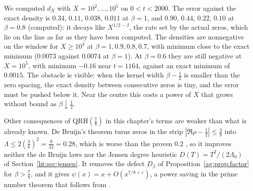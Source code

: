 We computed $d_X$ with $X=10^2,\dots,10^5$ on $0<t<2000$. The error against the exact density is $0.34$, $0.11$, $0.038$, $0.011$ at $\beta=1$, and $0.90$, $0.44$, $0.22$, $0.10$ at $\beta=0.8$ (computed): it decays like $X^{1/2-\beta}$, the rate set by the actual zeros, which lie on the line as far as they have been computed. The densities are nonnegative on the window for $X\ge10^3$ at $\beta=1,0.9,0.8,0.7$, with minimum close to the exact minimum ($0.0073$ against $0.0074$ at $\beta=1$). At $\beta=0.6$ they are still negative at $X=10^5$, with minimum $-0.16$ near $t=1164$, against an exact minimum of $0.0015$.
The obstacle is visible: when the kernel width $\beta-\frac12$ is smaller than the zero spacing, the exact density between consecutive zeros is tiny, and the error must be pushed below it. Near the centre this costs a power of $X$ that grows without bound as $\beta\downarrow\frac12$.

Other consequences of $\mathrm{QRH}(\frac78)$ in this chapter's terms are weaker than what is already known. De Bruijn's theorem turns zeros in the strip $|\Re\rho-\frac12|\le\frac38$ into $\Lambda\le2(\frac38)^2=\frac9{32}=0.28$, which is worse than the proven $0.2$ \cite{PT21}, so it improves neither the de Bruijn laws nor the Jensen degree heuristic $D(T)=T^2/(2\Lambda_0)$ of Section~\ref{ht:sec:jensen}. It removes the defect $D_\beta$ of Proposition~\ref{ag:prop:factor} for $\beta>\frac78$, and it gives $\psi(x)=x+O(x^{7/8+\varepsilon})$, a power saving in the prime number theorem that follows from \cite{OAI26a}.

